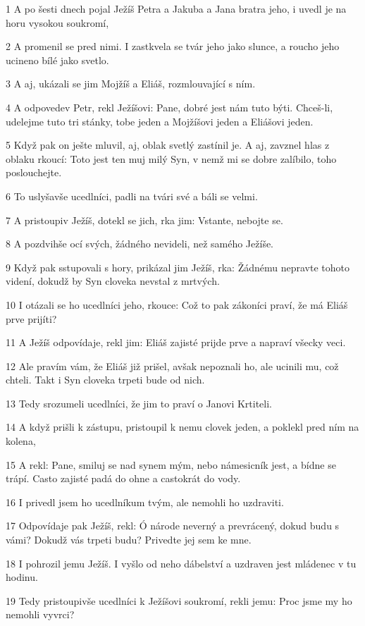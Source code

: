 \par 1 A po šesti dnech pojal Ježíš Petra a Jakuba a Jana bratra jeho, i uvedl je na horu vysokou soukromí,
\par 2 A promenil se pred nimi. I zastkvela se tvár jeho jako slunce, a roucho jeho ucineno bílé jako svetlo.
\par 3 A aj, ukázali se jim Mojžíš a Eliáš, rozmlouvající s ním.
\par 4 A odpovedev Petr, rekl Ježíšovi: Pane, dobré jest nám tuto býti. Chceš-li, udelejme tuto tri stánky, tobe jeden a Mojžíšovi jeden a Eliášovi jeden.
\par 5 Když pak on ješte mluvil, aj, oblak svetlý zastínil je. A aj, zavznel hlas z oblaku rkoucí: Toto jest ten muj milý Syn, v nemž mi se dobre zalíbilo, toho poslouchejte.
\par 6 To uslyšavše ucedlníci, padli na tvári své a báli se velmi.
\par 7 A pristoupiv Ježíš, dotekl se jich, rka jim: Vstante, nebojte se.
\par 8 A pozdvihše ocí svých, žádného nevideli, než samého Ježíše.
\par 9 Když pak sstupovali s hory, prikázal jim Ježíš, rka: Žádnému nepravte tohoto videní, dokudž by Syn cloveka nevstal z mrtvých.
\par 10 I otázali se ho ucedlníci jeho, rkouce: Což to pak zákoníci praví, že má Eliáš prve prijíti?
\par 11 A Ježíš odpovídaje, rekl jim: Eliáš zajisté prijde prve a napraví všecky veci.
\par 12 Ale pravím vám, že Eliáš již prišel, avšak nepoznali ho, ale ucinili mu, což chteli. Takt i Syn cloveka trpeti bude od nich.
\par 13 Tedy srozumeli ucedlníci, že jim to praví o Janovi Krtiteli.
\par 14 A když prišli k zástupu, pristoupil k nemu clovek jeden, a poklekl pred ním na kolena,
\par 15 A rekl: Pane, smiluj se nad synem mým, nebo námesicník jest, a bídne se trápí. Casto zajisté padá do ohne a castokrát do vody.
\par 16 I privedl jsem ho ucedlníkum tvým, ale nemohli ho uzdraviti.
\par 17 Odpovídaje pak Ježíš, rekl: Ó národe neverný a prevrácený, dokud budu s vámi? Dokudž vás trpeti budu? Privedte jej sem ke mne.
\par 18 I pohrozil jemu Ježíš. I vyšlo od neho dábelství a uzdraven jest mládenec v tu hodinu.
\par 19 Tedy pristoupivše ucedlníci k Ježíšovi soukromí, rekli jemu: Proc jsme my ho nemohli vyvrci?
